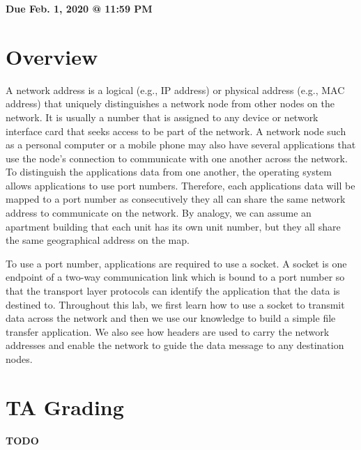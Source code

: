 \documentclass[11pt]{article}
\makeatletter
\def\datedue{Feb. 1, 2020 @ 11:59 PM}
\makeatother
\begin{document}
\maketitle \thispagestyle{fancy}

\hfill {\large \textbf{Due \datedue}}


\section{Overview}
\label{sec:overview}
A network address is a logical (e.g., IP address) or physical address (e.g., MAC address) that uniquely distinguishes a network node from other nodes on the network. It is usually a number that is assigned to any device or network interface card that seeks access to be part of the network. A network node such as a personal computer or a mobile phone may also have several applications that use the node's connection to communicate with one another across the network. To distinguish the applications data from one another, the operating system allows applications to use port numbers. Therefore, each applications data will be mapped to a port number as consecutively they all can share the same network address to communicate on the network. By analogy, we can assume an apartment building that each unit has its own unit number, but they all share the same geographical address on the map. 

To use a port number, applications are required to use a socket. A socket is one endpoint of a two-way communication link which is bound to a port number so that the transport layer protocols can identify the application that the data is destined to. Throughout this lab, we first learn how to use a socket to transmit data across the network and then we use our knowledge to build a simple file transfer application. We also see how headers are used to carry the network addresses and enable the network to guide the data message to any destination nodes.

\section{TA Grading}
\label{sec:tagrading}
\textbf{TODO}
\end{document}

